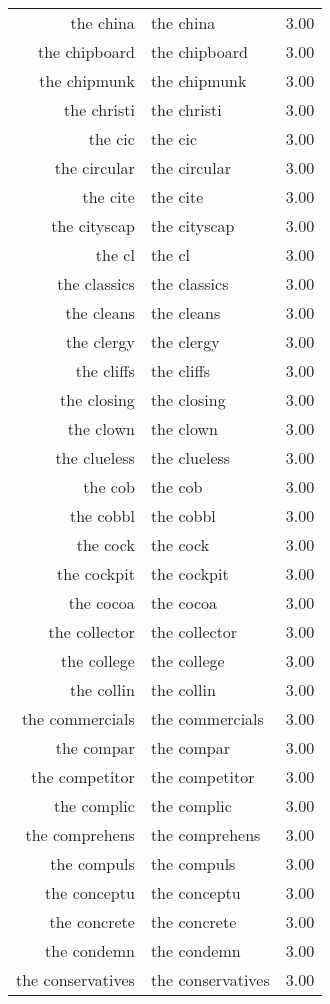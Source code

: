 \begin{table}[ht]
\begin{tabular}{rlr}
  the china & the china & 3.00 \\ 
  the chipboard & the chipboard & 3.00 \\ 
  the chipmunk & the chipmunk & 3.00 \\ 
  the christi & the christi & 3.00 \\ 
  the cic & the cic & 3.00 \\ 
  the circular & the circular & 3.00 \\ 
  the cite & the cite & 3.00 \\ 
  the cityscap & the cityscap & 3.00 \\ 
  the cl & the cl & 3.00 \\ 
  the classics & the classics & 3.00 \\ 
  the cleans & the cleans & 3.00 \\ 
  the clergy & the clergy & 3.00 \\ 
  the cliffs & the cliffs & 3.00 \\ 
  the closing & the closing & 3.00 \\ 
  the clown & the clown & 3.00 \\ 
  the clueless & the clueless & 3.00 \\ 
  the cob & the cob & 3.00 \\ 
  the cobbl & the cobbl & 3.00 \\ 
  the cock & the cock & 3.00 \\ 
  the cockpit & the cockpit & 3.00 \\ 
  the cocoa & the cocoa & 3.00 \\ 
  the collector & the collector & 3.00 \\ 
  the college & the college & 3.00 \\ 
  the collin & the collin & 3.00 \\ 
  the commercials & the commercials & 3.00 \\ 
  the compar & the compar & 3.00 \\ 
  the competitor & the competitor & 3.00 \\ 
  the complic & the complic & 3.00 \\ 
  the comprehens & the comprehens & 3.00 \\ 
  the compuls & the compuls & 3.00 \\ 
  the conceptu & the conceptu & 3.00 \\ 
  the concrete & the concrete & 3.00 \\ 
  the condemn & the condemn & 3.00 \\ 
  the conservatives & the conservatives & 3.00 \\ 

\end{tabular}
\end{table}
